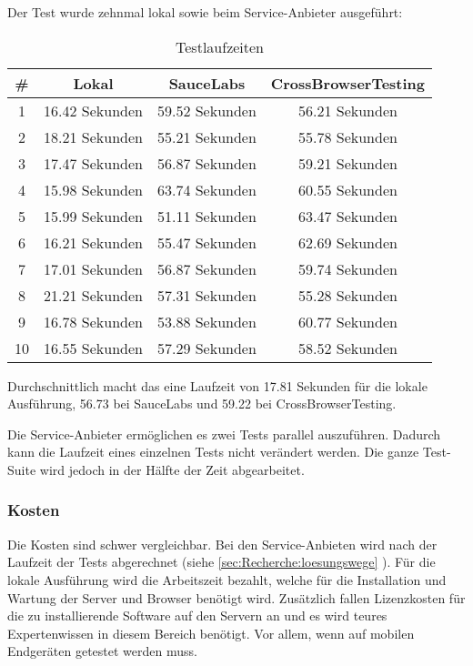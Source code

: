Der Test wurde zehnmal lokal sowie beim Service-Anbieter ausgeführt:
\begin{table}[H] 
	\caption{Testlaufzeiten}
	\centering
		
	\begin{tabular}{ | c | c | c | c |} 
		\hline 
			\rowcolor{tableheadcolor}
				 \bfseries \# & 
				 \bfseries Lokal & 
				 \bfseries SauceLabs &
				 \bfseries CrossBrowserTesting \\ \hline 
			1 & 16.42 Sekunden & 59.52 Sekunden & 56.21 Sekunden \\ \hline 
			2 & 18.21 Sekunden & 55.21 Sekunden & 55.78 Sekunden \\ \hline 
			3 & 17.47 Sekunden & 56.87 Sekunden & 59.21 Sekunden \\ \hline 
			4 & 15.98 Sekunden & 63.74 Sekunden & 60.55 Sekunden \\ \hline 
			5 & 15.99 Sekunden & 51.11 Sekunden & 63.47 Sekunden \\ \hline 
			6 & 16.21 Sekunden & 55.47 Sekunden & 62.69 Sekunden \\ \hline 
			7 & 17.01 Sekunden & 56.87 Sekunden & 59.74 Sekunden \\ \hline 
			8 & 21.21 Sekunden & 57.31 Sekunden & 55.28 Sekunden \\ \hline 
			9 & 16.78 Sekunden & 53.88 Sekunden & 60.77 Sekunden \\ \hline 
			10 & 16.55 Sekunden & 57.29 Sekunden & 58.52 Sekunden \\ \hline 
	\end{tabular} 
\end{table}
Durchschnittlich macht das eine Laufzeit von 17.81 Sekunden für die lokale Ausführung, 56.73 bei SauceLabs und 59.22 bei CrossBrowserTesting.

Die Service-Anbieter ermöglichen es zwei Tests parallel auszuführen. Dadurch kann die Laufzeit eines einzelnen Tests nicht verändert werden. Die ganze Test-Suite wird jedoch in der Hälfte der Zeit abgearbeitet.

\subsubsection{Kosten}
Die Kosten sind schwer vergleichbar. Bei den Service-Anbieten wird nach der Laufzeit der Tests abgerechnet (siehe \cref{sec:Recherche:loesungswege} ). Für die lokale Ausführung wird die Arbeitszeit bezahlt, welche für die Installation und Wartung der Server und Browser benötigt wird. Zusätzlich fallen Lizenzkosten für die zu installierende Software auf den Servern an und es wird teures Expertenwissen in diesem Bereich benötigt. Vor allem, wenn auf mobilen Endgeräten getestet werden muss.

